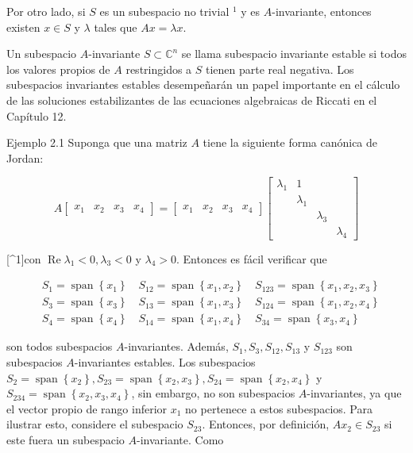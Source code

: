 Por otro lado, si $S$ es un subespacio no trivial ${ }^{1}$ y es $A$-invariante, entonces existen $x \in S$ y $\lambda$ tales que $A x=\lambda x$.

Un subespacio $A$-invariante $S \subset \mathbb{C}^{n}$ se llama subespacio invariante estable si todos los valores propios de $A$ restringidos a $S$ tienen parte real negativa. Los subespacios invariantes estables desempeñarán un papel importante en el cálculo de las soluciones estabilizantes de las ecuaciones algebraicas de Riccati en el Capítulo 12.

Ejemplo 2.1 Suponga que una matriz $A$ tiene la siguiente forma canónica de Jordan:

$$
A\left[\begin{array}{llll}
x_{1} & x_{2} & x_{3} & x_{4}
\end{array}\right]=\left[\begin{array}{llll}
x_{1} & x_{2} & x_{3} & x_{4}
\end{array}\right]\left[\begin{array}{cccc}
\lambda_{1} & 1 & & \\
& \lambda_{1} & & \\
& & \lambda_{3} & \\
& & & \lambda_{4}
\end{array}\right]
$$

[\^{}1]con $\operatorname{Re} \lambda_{1}<0, \lambda_{3}<0$ y $\lambda_{4}>0$. Entonces es fácil verificar que

$$
\begin{aligned}
& S_{1}=\operatorname{span}\left\{x_{1}\right\} \quad S_{12}=\operatorname{span}\left\{x_{1}, x_{2}\right\} \quad S_{123}=\operatorname{span}\left\{x_{1}, x_{2}, x_{3}\right\} \\
& S_{3}=\operatorname{span}\left\{x_{3}\right\} \quad S_{13}=\operatorname{span}\left\{x_{1}, x_{3}\right\} \quad S_{124}=\operatorname{span}\left\{x_{1}, x_{2}, x_{4}\right\} \\
& S_{4}=\operatorname{span}\left\{x_{4}\right\} \quad S_{14}=\operatorname{span}\left\{x_{1}, x_{4}\right\} \quad S_{34}=\operatorname{span}\left\{x_{3}, x_{4}\right\}
\end{aligned}
$$

son todos subespacios $A$-invariantes. Además, $S_{1}, S_{3}, S_{12}, S_{13}$ y $S_{123}$ son subespacios $A$-invariantes estables. Los subespacios $S_{2}=\operatorname{span}\left\{x_{2}\right\}, S_{23}=\operatorname{span}\left\{x_{2}, x_{3}\right\}, S_{24}=\operatorname{span}\left\{x_{2}, x_{4}\right\}$ y $S_{234}=\operatorname{span}\left\{x_{2}, x_{3}, x_{4}\right\}$, sin embargo, no son subespacios $A$-invariantes, ya que el vector propio de rango inferior $x_{1}$ no pertenece a estos subespacios. Para ilustrar esto, considere el subespacio $S_{23}$. Entonces, por definición, $A x_{2} \in S_{23}$ si este fuera un subespacio $A$-invariante. Como

